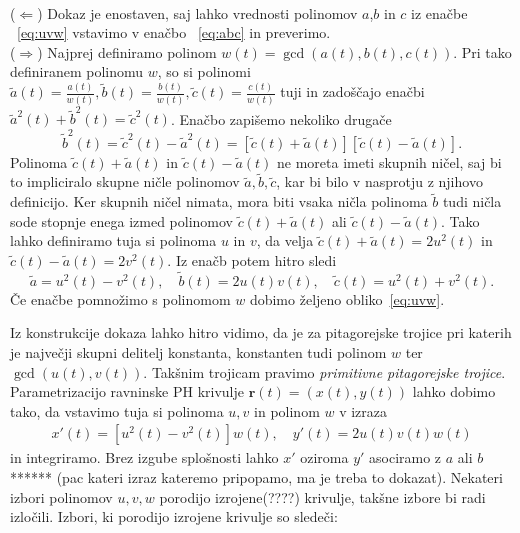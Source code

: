 \documentclass[isrm2, tisk]{fmfdelo}
\begin{document}
    \begin{dokaz}
        \mbox{}\\
        ($\Leftarrow$) Dokaz je enostaven, saj lahko vrednosti polinomov $a$,$b$ in $c$ iz enačbe ~\eqref{eq:uvw} vstavimo v enačbo ~\eqref{eq:abc} in preverimo. \\
        ($\Rightarrow$) Najprej definiramo polinom $w(t)=\gcd(a(t),b(t),c(t))$.
        Pri tako definiranem polinomu $w$, so si polinomi $\tilde{a}(t)=\frac{a(t)}{w(t)}, \tilde{b}(t)=\frac{b(t)}{w(t)}, \tilde{c}(t)=\frac{c(t)}{w(t)}$ tuji in zadoščajo enačbi $\tilde{a}^2(t)+\tilde{b}^2(t)=\tilde{c}^2(t)$.
        Enačbo zapišemo nekoliko drugače \[\tilde{b}^2(t)= \tilde{c}^2(t)-\tilde{a}^2(t) = [\tilde{c}(t)+\tilde{a}(t)][\tilde{c}(t)-\tilde{a}(t)].\]
        Polinoma $\tilde{c}(t)+\tilde{a}(t)$ in $\tilde{c}(t)-\tilde{a}(t)$ ne moreta imeti skupnih ničel, saj bi to impliciralo skupne ničle polinomov $\tilde{a},\tilde{b},\tilde{c}$, kar bi bilo v nasprotju z njihovo definicijo.
        Ker skupnih ničel nimata, mora biti vsaka ničla polinoma $\tilde{b}$ tudi ničla sode stopnje enega izmed polinomov $\tilde{c}(t)+\tilde{a}(t)$ ali $\tilde{c}(t)-\tilde{a}(t)$.
        Tako lahko definiramo tuja si polinoma $u$ in $v$, da velja $\tilde{c}(t)+\tilde{a}(t)=2u^2(t)$ in $\tilde{c}(t)-\tilde{a}(t)=2v^2(t)$.
        Iz enačb potem hitro sledi \[\tilde{a}=u^2(t)-v^2(t),\quad\tilde{b}(t)=2u(t)v(t), \quad\tilde{c}(t)=u^2(t)+v^2(t).\]
        Če enačbe pomnožimo s polinomom $w$ dobimo željeno obliko~\eqref{eq:uvw}. \qedhere
    \end{dokaz}
    Iz konstrukcije dokaza lahko hitro vidimo, da je za pitagorejske trojice pri katerih je največji skupni delitelj konstanta, konstanten tudi polinom $w$ ter $\gcd(u(t),v(t))$.
    Takšnim trojicam pravimo \textit{primitivne pitagorejske trojice}.
    Parametrizacijo ravninske PH krivulje $\mathbf{r}(t)=(x(t),y(t))$ lahko dobimo tako, da vstavimo tuja si polinoma $u,v$ in polinom $w$ v izraza
    \begin{align}
        x'(t)=[u^2(t)-v^2(t)]w(t),\quad y'(t)=2u(t)v(t)w(t)  \label{eq:hodograf-splosni}
    \end{align} in integriramo.
    Brez izgube splošnosti lahko $x'$ oziroma $y'$ asociramo z $a$ ali $b$****** (pac kateri izraz kateremo pripopamo, ma je treba to dokazat).
    Nekateri izbori polinomov $u,v,w$ porodijo izrojene(????) krivulje, takšne izbore bi radi izločili.
    Izbori, ki porodijo izrojene krivulje so sledeči:
    \vspace{-0.3cm}
\end{document}

